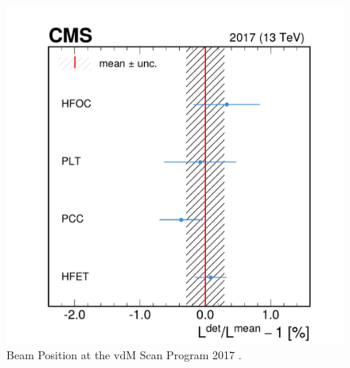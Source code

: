 \begin{figure}[h]
  \hspace{-1.9cm}
  \begin{minipage}{0.48\textwidth}
    \centering
    \includegraphics[scale=.4]{Chapter3/2017_stability/means_clean__hfet-pcc-plt-hfocdivmean_PCConly.pdf}
    \raggedleft
    \caption[Doros]{Beam Position at the vdM Scan Program 2017 \cite{lhc_complex}.}
    \label{BeamPosition_2017}
  \end{minipage}
  \hspace{1cm} %
  \begin{minipage}{0.48\textwidth}
    \centering
\end{minipage}
\end{figure}
